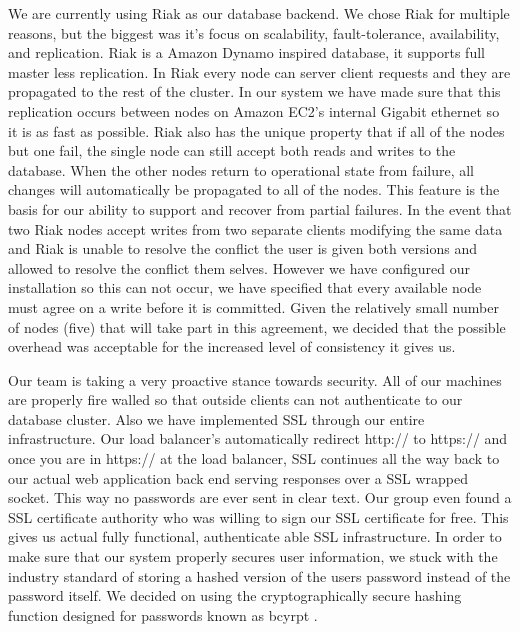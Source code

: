 \documentclass{dependencies/acm_proc_article-sp}
\begin{document}
We are currently using Riak as our database backend. We chose Riak for multiple
reasons, but the biggest was it's focus on  scalability, fault-tolerance,
availability, and replication. Riak is a Amazon Dynamo \cite{dynamo} inspired
database, it supports full master less replication. In Riak every node can
server client requests and they are propagated to the rest of the cluster.
In our system we have made sure that this replication occurs between nodes
on Amazon EC2's internal Gigabit ethernet so it is as fast as possible. Riak
also has the unique property that if all of the nodes but one fail, the single
node can still accept both reads and writes to the database. When the other
nodes return to operational state from failure, all changes will automatically
be propagated to all of the nodes. This feature is the basis for our ability to
support and recover from partial failures. In the event that two Riak nodes accept
writes from two separate clients modifying the same data and Riak is unable
to resolve the conflict the user is given both versions and allowed to resolve
the conflict them selves. However we have configured our installation so this
can not occur, we have specified that every available node must agree on a
write before it is committed. Given the relatively small number of nodes (five)
that will take part in this agreement, we decided that the possible overhead
was acceptable for the increased level of consistency it gives us.

Our team is taking a very proactive stance towards security. All of our machines are properly fire walled so that
outside clients can not authenticate to our database cluster. Also we have implemented SSL through our entire infrastructure.
Our load balancer's automatically redirect http:// to https:// and once you are in https:// at the load balancer, SSL continues all the
way back to our actual web application back end serving responses over a SSL wrapped socket. This way no passwords are ever
sent in clear text. Our group even found a SSL certificate authority who was willing to sign our SSL certificate for free. This gives
us actual fully functional, authenticate able SSL infrastructure. In order to make sure that our system properly secures user information,
we stuck with the industry standard of storing a hashed version of the users password instead of the password itself. We decided on using
the cryptographically secure hashing function designed for passwords known as bcyrpt \cite{bcrypt}.

%

%
%
\balancecolumns
\end{document}
